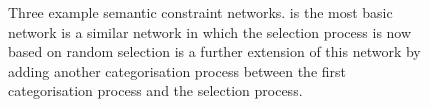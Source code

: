 \begin{figure}
\centering
{}
\caption[Three example semantic constraint networks]{Three example semantic
  constraint networks.  is the most basic network
   is a similar network in which the
  selection process is now based on random selection
   is a further extension of this network by
  adding another categorisation process between the first
  categorisation process and the selection process.}
\label{f:map-networks}
\end{figure}


